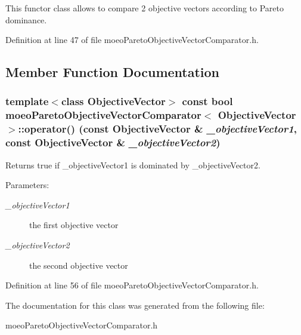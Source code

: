This functor class allows to compare 2 objective vectors according to Pareto dominance. 



Definition at line 47 of file moeo\-Pareto\-Objective\-Vector\-Comparator.h.

\subsection{Member Function Documentation}
\subsubsection{\setlength{\rightskip}{0pt plus 5cm}template$<$class Objective\-Vector$>$ const bool \bf{moeo\-Pareto\-Objective\-Vector\-Comparator}$<$ Objective\-Vector $>$::operator() (const Objective\-Vector \& {\em \_\-objective\-Vector1}, const Objective\-Vector \& {\em \_\-objective\-Vector2})\hspace{0.3cm}{\tt  [inline]}}\label{classmoeoParetoObjectiveVectorComparator_9bd4302396fb179efe14035dc097726c}


Returns true if \_\-objective\-Vector1 is dominated by \_\-objective\-Vector2. 

\begin{Desc}
\item[Parameters:]
\begin{description}
\item[{\em \_\-objective\-Vector1}]the first objective vector \item[{\em \_\-objective\-Vector2}]the second objective vector \end{description}
\end{Desc}


Definition at line 56 of file moeo\-Pareto\-Objective\-Vector\-Comparator.h.

The documentation for this class was generated from the following file:\begin{CompactItemize}
\item 
moeo\-Pareto\-Objective\-Vector\-Comparator.h\end{CompactItemize}
